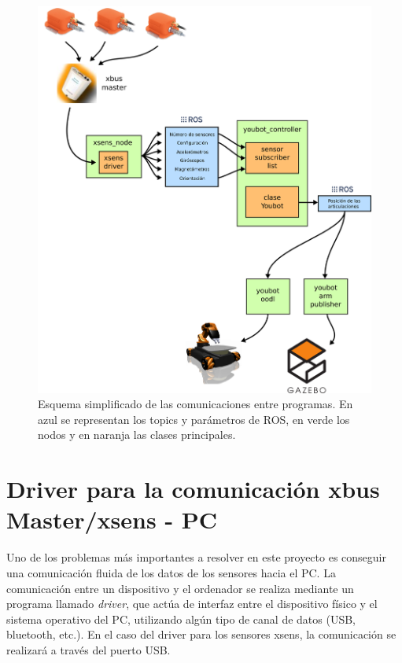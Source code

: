 \documentclass[12pt, a4paper]{report}
\begin{document}
\begin{figure}[h]
	\centering
		\includegraphics[scale=0.30]{../img/communications.png} 
	\caption[Esquema simplificado de comunicaciones]{Esquema simplificado de las comunicaciones entre programas. En azul se representan los topics y parámetros de ROS, en verde los nodos y en naranja las clases principales. } 
	\label{fig: communications}
\end{figure}


\section{Driver para la comunicación xbus Master/xsens - PC}

Uno de los problemas más importantes a resolver en este proyecto es conseguir una comunicación fluida de los datos de los sensores hacia el PC. La comunicación entre un dispositivo y el ordenador se realiza mediante un programa llamado \textit{driver}, que actúa de interfaz entre el dispositivo físico y el sistema operativo del PC, utilizando algún tipo de canal de datos (USB, bluetooth, etc.). En el caso del driver para los sensores xsens, la comunicación se realizará a través del puerto USB.\\
\end{document}
